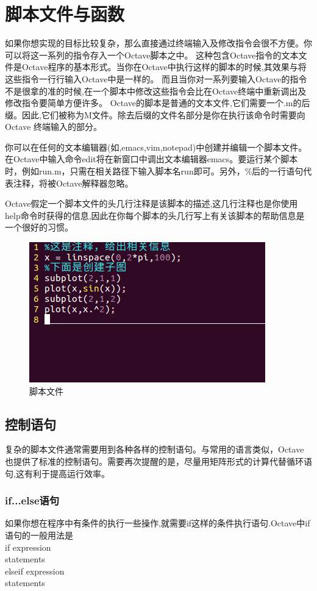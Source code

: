\documentclass[a4paper,11pt]{ctexart}
\begin{document}
\section{脚本文件与函数}
如果你想实现的目标比较复杂，那么直接通过终端输入及修改指令会很不方便。你可以将这一系列的指令存入一个Octave脚本之中。
这种包含Octave指令的文本文件是Octave程序的基本形式。当你在Octave中执行这样的脚本的时候,其效果与将这些指令一行行输入Octave中是一样的。
而且当你对一系列要输入Octave的指令不是很拿的准的时候,在一个脚本中修改这些指令会比在Octave终端中重新调出及修改指令要简单方便许多。
Octave的脚本是普通的文本文件,它们需要一个.m的后缀。因此,它们被称为M文件。除去后缀的文件名部分是你在执行该命令时需要向Octave 终端输入的部分。\par
你可以在任何的文本编辑器(如,emacs,vim,notepad)中创建并编辑一个脚本文件。在Octave中输入命令edit将在新窗口中调出文本编辑器emacs。要运行某个脚本时，例如run.m，只需在相关路径下输入脚本名run即可。另外，$\%$后的一行语句代表注释，将被Octave解释器忽略。\par
Octave假定一个脚本文件的头几行注释是该脚本的描述,这几行注释也是你使用help命令时获得的信息,因此在你每个脚本的头几行写上有关该脚本的帮助信息是一个很好的习惯。
\begin{figure}[H]
	\begin{center}
		\includegraphics[width=.8\textwidth]{m.png}
	\end{center}
	\caption{脚本文件}
\end{figure}
\subsection{控制语句}
复杂的脚本文件通常需要用到各种各样的控制语句。与常用的语言类似，Octave也提供了标准的控制语句。需要再次提醒的是，尽量用矩阵形式的计算代替循环语句,这有利于提高运行效率。
\subsubsection{if...else语句}
如果你想在程序中有条件的执行一些操作,就需要if这样的条件执行语句.Octave中if语句的一般用法是\\
if expression\\
\indent statements\\
elseif expression\\
\indent statements
\end{document}
